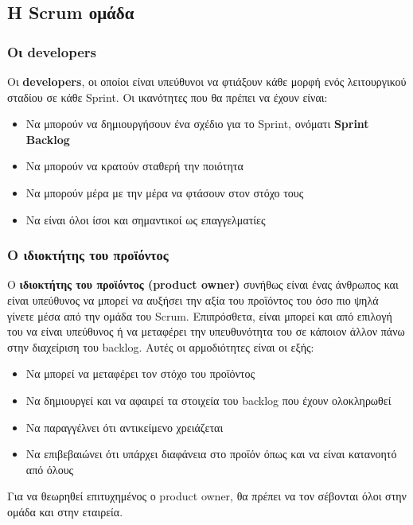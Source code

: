 \subsection{Η Scrum ομάδα}
\subsubsection{Οι developers}

Οι \textbf{developers}, οι οποίοι είναι υπεύθυνοι να φτιάξουν κάθε μορφή ενός λειτουργικού σταδίου σε κάθε Sprint.
Οι ικανότητες που θα πρέπει να έχουν είναι:

\begin{itemize}
  \item Να μπορούν να δημιουργήσουν ένα σχέδιο για το Sprint, ονόματι \textbf{Sprint Backlog}
  \item Να μπορούν να κρατούν σταθερή την ποιότητα
  \item Να μπορούν μέρα με την μέρα να φτάσουν στον στόχο τους
  \item Να είναι όλοι ίσοι και σημαντικοί ως επαγγελματίες
\end{itemize}

\subsubsection{Ο ιδιοκτήτης του προϊόντος}

Ο \textbf{ιδιοκτήτης του προϊόντος (product owner)} συνήθως είναι ένας άνθρωπος και είναι υπεύθυνος να μπορεί να αυξήσει την αξία του προϊόντος του όσο πιο ψηλά γίνετε μέσα από την ομάδα του Scrum.
Επιπρόσθετα, είναι μπορεί και από επιλογή του να είναι υπεύθυνος ή να μεταφέρει την υπευθυνότητα του σε κάποιον άλλον πάνω στην διαχείριση του backlog. Αυτές οι αρμοδιότητες είναι οι εξής:

\begin{itemize}
  \item Να μπορεί να μεταφέρει τον στόχο του προϊόντος
  \item Να δημιουργεί και να αφαιρεί τα στοιχεία του backlog που έχουν ολοκληρωθεί
  \item Να παραγγέλνει ότι αντικείμενο χρειάζεται
  \item Να επιβεβαιώνει ότι υπάρχει διαφάνεια στο προϊόν όπως και να είναι κατανοητό από όλους
\end{itemize}

Για να θεωρηθεί επιτυχημένος ο product owner, θα πρέπει να τον σέβονται όλοι στην ομάδα και στην εταιρεία.

